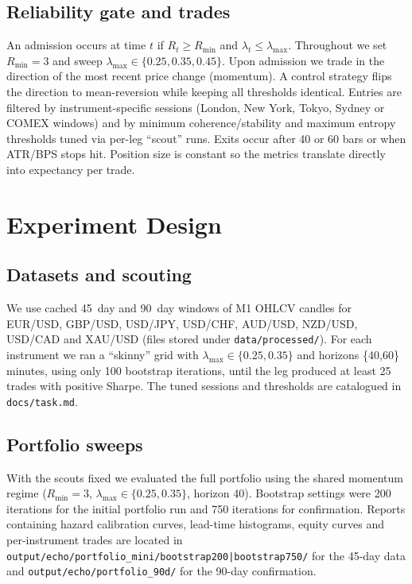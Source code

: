 \documentclass[11pt]{article}
\begin{document}
\subsection{Reliability gate and trades}
An admission occurs at time $t$ if $R_t\ge R_{\min}$ and
$\lambda_t \le \lambda_{\max}$.  Throughout we set $R_{\min}=3$ and sweep
$\lambda_{\max}\in\{0.25,0.35,0.45\}$.  Upon admission we trade in the
direction of the most recent price change (momentum).  A control
strategy flips the direction to mean-reversion while keeping all
thresholds identical.  Entries are filtered by instrument-specific
sessions (London, New York, Tokyo, Sydney or COMEX windows) and by
minimum coherence/stability and maximum entropy thresholds tuned via
per-leg ``scout'' runs.  Exits occur after 40 or 60 bars or when ATR/BPS
stops hit.  Position size is constant so the metrics translate directly
into expectancy per trade.

\section{Experiment Design}

\subsection{Datasets and scouting}
We use cached \SI{45}{day} and \SI{90}{day} windows of M1 OHLCV candles
for EUR/USD, GBP/USD, USD/JPY, USD/CHF, AUD/USD, NZD/USD, USD/CAD and
XAU/USD (files stored under \texttt{data/processed/}).  For each
instrument we ran a ``skinny'' grid with $\lambda_{\max}\in\{0.25,0.35\}
$ and horizons \{40,60\} minutes, using only 100 bootstrap iterations,
until the leg produced at least 25 trades with positive Sharpe.  The
tuned sessions and thresholds are catalogued in \texttt{docs/task.md}.

\subsection{Portfolio sweeps}
With the scouts fixed we evaluated the full portfolio using the shared
momentum regime ($R_{\min}=3$, $\lambda_{\max}\in\{0.25,0.35\}$,
horizon 40).  Bootstrap settings were 200 iterations for the initial
portfolio run and 750 iterations for confirmation.  Reports containing
hazard calibration curves, lead-time histograms, equity curves and
per-instrument trades are located in
\texttt{output/echo/portfolio\_mini/bootstrap200|bootstrap750/} for the
45-day data and \texttt{output/echo/portfolio\_90d/} for the 90-day
confirmation.
\end{document}
